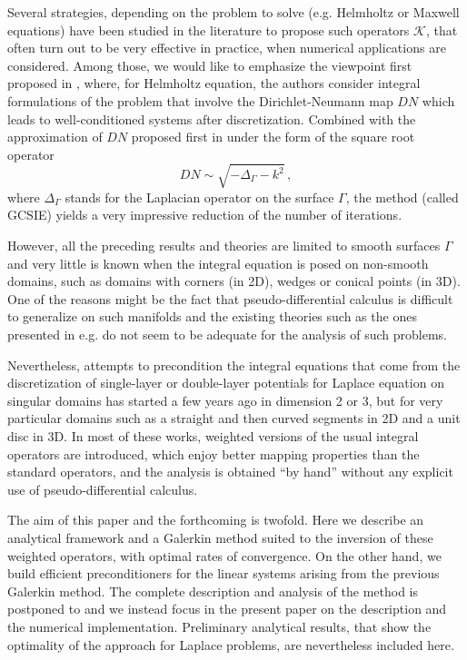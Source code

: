 \documentclass[a4paper]{article}
\begin{document}
Several strategies, depending on the problem to solve (e.g. Helmholtz or Maxwell equations) have been studied in the literature to propose such 
operators $\mathcal{K}$, that often turn out to be very effective in practice, when numerical applications are considered. Among those, we would 
like to emphasize the viewpoint first proposed in \cite{alouges2005new,alouges2007stable}, where, for Helmholtz equation, the authors consider 
integral formulations of the problem that involve the Dirichlet-Neumann map $DN$ which leads to well-conditioned systems after discretization. 
Combined with the approximation of $DN$ proposed first in \cite{antoine2007generalized} under the form of the square root operator
\begin{equation}
DN \sim \sqrt{-\Delta_\Gamma -k^2}\,,
\end{equation}
where $\Delta_\Gamma$ stands for the Laplacian operator on the surface $\Gamma$, the method (called GCSIE) yields a very impressive 
reduction of the number of iterations. 

However, all the preceding results and theories are limited to smooth surfaces $\Gamma$ and very little is known when the integral equation 
is posed on non-smooth domains, such as domains with corners (in 2D), wedges or conical points (in 3D). One of the reasons might be the 
fact that pseudo-differential calculus is difficult to generalize on such manifolds and the existing theories such as the ones presented in e.g. 
\cite{melrose,schulze1,schulze2} do not seem to be adequate for the analysis of such problems.

Nevertheless, attempts to precondition the integral equations that come from the discretization of single-layer or double-layer potentials 
for Laplace equation on singular domains has started a few years ago \cite{bruno2012second,hiptmair2017closed,jerez2012explicit,
hiptmair2014mesh,ramaciotti2017some} in dimension 2 or 3, but for very particular domains such as a straight and then curved segments 
in 2D and a unit disc in 3D. In most of these works, weighted versions of the usual integral operators are introduced, which enjoy better 
mapping properties than the standard operators, and the analysis is obtained ``by hand'' without any explicit use of pseudo-differential calculus. 

The aim of this paper and the forthcoming \cite{averseng} is twofold. Here we describe an analytical framework and a Galerkin method suited to the inversion of these weighted operators, with optimal rates of convergence. On the other hand, we build efficient preconditioners for the linear systems arising from the previous Galerkin method. The complete description and analysis of the method is postponed to \cite{averseng} and we instead focus in 
the present paper on the description and the numerical implementation. Preliminary analytical results, that show the optimality of the approach
for Laplace problems, are nevertheless included here.
	
\end{document}
